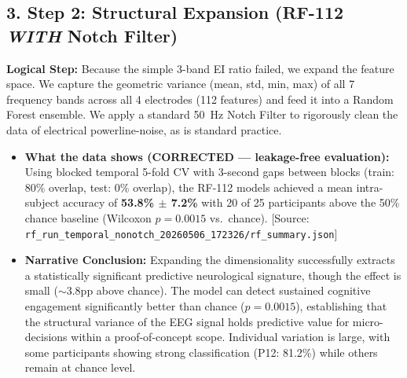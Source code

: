 \documentclass[12pt,a4paper]{report}
\begin{document}
\subsection{3. Step 2: Structural Expansion (RF-112 \textit{WITH} Notch Filter)}
\textbf{Logical Step:} Because the simple 3-band EI ratio failed, we expand the feature space. We capture the geometric variance (mean, std, min, max) of all 7 frequency bands across all 4 electrodes (112 features) and feed it into a Random Forest ensemble. We apply a standard 50~Hz Notch Filter to rigorously clean the data of electrical powerline-noise, as is standard practice.
\begin{itemize}
    \item \textbf{What the data shows (CORRECTED --- leakage-free evaluation):} Using blocked temporal 5-fold CV with 3-second gaps between blocks (train: 80\% overlap, test: 0\% overlap), the RF-112 models achieved a mean intra-subject accuracy of \textbf{53.8\% $\pm$ 7.2\%} with 20 of 25 participants above the 50\% chance baseline (Wilcoxon $p=0.0015$ vs.\ chance). [Source: \verb|rf_run_temporal_nonotch_20260506_172326/rf_summary.json|]
    \item \textbf{Narrative Conclusion:} Expanding the dimensionality successfully extracts a statistically significant predictive neurological signature, though the effect is small ($\sim$3.8pp above chance). The model can detect sustained cognitive engagement significantly better than chance ($p=0.0015$), establishing that the structural variance of the EEG signal holds predictive value for micro-decisions within a proof-of-concept scope. Individual variation is large, with some participants showing strong classification (P12: 81.2\%) while others remain at chance level.
\end{itemize}
\end{document}
